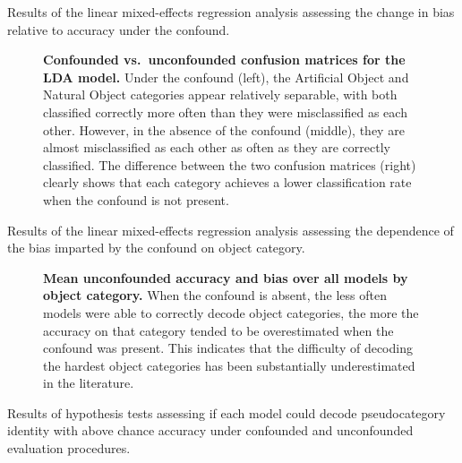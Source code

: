 \documentclass{article}
\begin{document}
\begin{table}
  \caption{Results of the linear mixed-effects regression analysis assessing the change in bias relative to accuracy under the confound.}
  \label{tab:bias-vs-confounded-lme}
  \centering
  
\end{table}

\begin{figure}
  \centering
  \caption{\textbf{Confounded vs.\ unconfounded confusion matrices for the LDA model.}
  Under the confound (left), the Artificial Object and Natural Object categories appear relatively separable, with both classified correctly more often than they were misclassified as each other. However, in the absence of the confound (middle), they are almost misclassified as each other as often as they are correctly classified. The difference between the two confusion matrices (right) clearly shows that each category achieves a lower classification rate when the confound is not present.}{}
  \label{fig:confounded-vs-unconfounded-confusion-matrix}
\end{figure}

\begin{table}
  \centering
  \caption{Results of the linear mixed-effects regression analysis assessing the dependence of the bias imparted by the confound on object category.}
  \label{tab:category-bias-lme}
  
\end{table}

\begin{figure}
  \centering
  \caption{\textbf{Mean unconfounded accuracy and bias over all models by object category.} When the confound is absent, the less often models were able to correctly decode object categories, the more the accuracy on that category tended to be overestimated when the confound was present. This indicates that the difficulty of decoding the hardest object categories has been substantially underestimated in the literature.
  \vspace{4em}}
  \label{fig:category-bias-accuracy}
\end{figure}

\begin{table}
  \caption{Results of hypothesis tests assessing if each model could decode pseudocategory identity with above chance accuracy under confounded and unconfounded evaluation procedures.}
  \label{tab:pseudocategory-hypothesis-tests}
  \centering
  
\end{table}
\end{document}
